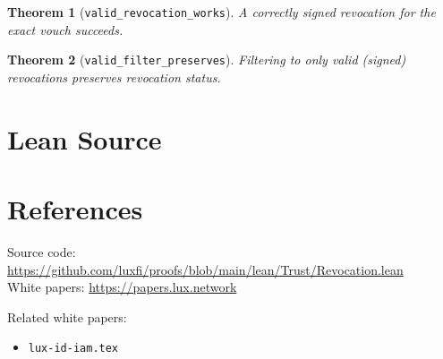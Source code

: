 \documentclass[11pt]{article}
\newtheorem{theorem}{Theorem}
\begin{document}
\begin{theorem}[\texttt{valid\_revocation\_works}]
A correctly signed revocation for the exact vouch succeeds.
\end{theorem}

\begin{theorem}[\texttt{valid\_filter\_preserves}]
Filtering to only valid (signed) revocations preserves revocation status.
\end{theorem}


\section{Lean Source}


\section{References}
\noindent Source code: \url{https://github.com/luxfi/proofs/blob/main/lean/Trust/Revocation.lean}\\
\noindent White papers: \url{https://papers.lux.network}

\noindent Related white papers:
\begin{itemize}
  \item \texttt{lux-id-iam.tex}
\end{itemize}
\end{document}
